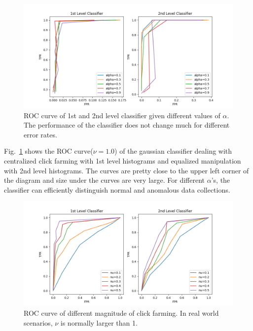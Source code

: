 \documentclass[a4paper]{IEEEtran}
\begin{document}
			\begin{figure}[!ht]
				\centering
				\includegraphics[width=\linewidth]{fig/ROC-Alpha.png}
				\caption{ROC curve of 1st and 2nd level classifier given different values of $\alpha$. The performance of the classifier does not change much for different error rates.}
				\label{fig:roc-alpha}
			\end{figure}
			
			Fig.~\ref{fig:roc-alpha} shows the ROC curve($\nu=1.0$) of the gaussian classifier dealing with centralized click farming with 1st level histograms and equalized manipulation with 2nd level histograms. The curves are pretty close to the upper left corner of the diagram and size under the curves are very large. For different $\alpha$'s, the classifier can efficiently distinguish normal and anomalous data collections.
			
			\begin{figure}[!ht]
				\centering
				\includegraphics[width=\linewidth]{fig/ROC-Nu.png}
				\caption{ROC curve of different magnitude of click farming. In real world scenarios, $\nu$ is normally larger than 1.}
				\label{fig:roc-magnitude}
			\end{figure}
			
\end{document}
